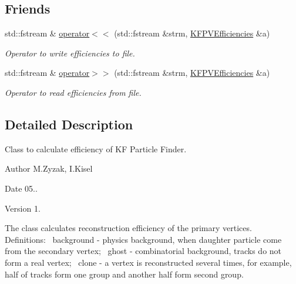 \subsection*{Friends}
\begin{DoxyCompactItemize}
\item 
std\+::fstream \& \hyperlink{classKFPVEfficiencies_a8003529fc9ef679bed0c6c5732f13e6a}{operator$<$$<$} (std\+::fstream \&strm, \hyperlink{classKFPVEfficiencies}{K\+F\+P\+V\+Efficiencies} \&a)\hypertarget{classKFPVEfficiencies_a8003529fc9ef679bed0c6c5732f13e6a}{}\label{classKFPVEfficiencies_a8003529fc9ef679bed0c6c5732f13e6a}

\begin{DoxyCompactList}\small\item\em Operator to write efficiencies to file. \end{DoxyCompactList}\item 
std\+::fstream \& \hyperlink{classKFPVEfficiencies_a59a63eaec59e54dbeb5f96bbfb373c99}{operator$>$$>$} (std\+::fstream \&strm, \hyperlink{classKFPVEfficiencies}{K\+F\+P\+V\+Efficiencies} \&a)\hypertarget{classKFPVEfficiencies_a59a63eaec59e54dbeb5f96bbfb373c99}{}\label{classKFPVEfficiencies_a59a63eaec59e54dbeb5f96bbfb373c99}

\begin{DoxyCompactList}\small\item\em Operator to read efficiencies from file. \end{DoxyCompactList}\end{DoxyCompactItemize}


\subsection{Detailed Description}
Class to calculate efficiency of KF Particle Finder. 

\begin{DoxyAuthor}{Author}
M.\+Zyzak, I.\+Kisel 
\end{DoxyAuthor}
\begin{DoxyDate}{Date}
05.. 
\end{DoxyDate}
\begin{DoxyVersion}{Version}
1.
\end{DoxyVersion}
The class calculates reconstruction efficiency of the primary vertices.~\newline
Definitions\+:~\newline
background -\/ physics background, when daughter particle come from the secondary vertex;~\newline
ghost -\/ combinatorial background, tracks do not form a real vertex;~\newline
clone -\/ a vertex is reconstructed several times, for example, half of tracks form one group and another half form second group. 

